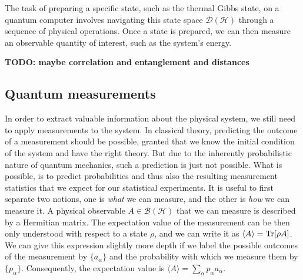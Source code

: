 The task of preparing a specific state, such as the thermal Gibbs state, on a quantum computer involves navigating this state space $\mathcal{D}(\mathcal{H})$ through a sequence of physical operations. Once a state is prepared, we can then measure an observable quantity of interest, such as the system's energy.

\textbf{TODO: maybe correlation and entanglement and distances}

\smallskip
\subsection{Quantum measurements} In order to extract valuable information about the physical system, we still need to apply measurements to the system. In classical theory, predicting the outcome of a measurement should be possible, granted that we know the initial condition of the system and have the right theory. But due to the inherently probabilistic nature of quantum mechanics, such a prediction is just not possible. What is possible, is to predict probabilities and thus also the resulting measurement statistics that we expect for our statistical experiments. It is useful to first separate two notions, one is \textit{what} we can measure, and the other is \textit{how} we can measure it. A physical observable $A \in \mathcal{B}(\mathcal{H})$ that we can measure is described by a Hermitian matrix. The expectation value of the measurement can be then only understood with respect to a state $\rho$, and we can write it as $\langle A \rangle = \operatorname{Tr} [\rho A]$. 
We can give this expression slightly more depth if we label the possible outcomes of the measurement by $\{a_\alpha\}$ and the probability with which we measure them by $\{p_\alpha\}$. Consequently, the expectation value is $\langle A \rangle = \sum_\alpha p_\alpha a_\alpha$. 

